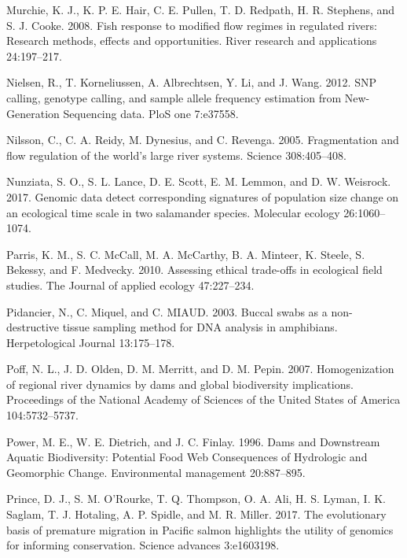 \documentclass[proquest,12pt,final]{ucthesis-CA2012} %
\begin{document}
\begin{ucmainmatter}
\leavevmode\hypertarget{ref-murchie_fish_2008}{}%
Murchie, K. J., K. P. E. Hair, C. E. Pullen, T. D. Redpath, H. R.
Stephens, and S. J. Cooke. 2008. Fish response to modified flow regimes
in regulated rivers: Research methods, effects and opportunities. River
research and applications 24:197--217.

\leavevmode\hypertarget{ref-nielsen_snp_2012}{}%
Nielsen, R., T. Korneliussen, A. Albrechtsen, Y. Li, and J. Wang. 2012.
SNP calling, genotype calling, and sample allele frequency estimation
from New-Generation Sequencing data. PloS one 7:e37558.

\leavevmode\hypertarget{ref-nilsson_fragmentation_2005}{}%
Nilsson, C., C. A. Reidy, M. Dynesius, and C. Revenga. 2005.
Fragmentation and flow regulation of the world's large river systems.
Science 308:405--408.

\leavevmode\hypertarget{ref-nunziata_genomic_2017}{}%
Nunziata, S. O., S. L. Lance, D. E. Scott, E. M. Lemmon, and D. W.
Weisrock. 2017. Genomic data detect corresponding signatures of
population size change on an ecological time scale in two salamander
species. Molecular ecology 26:1060--1074.

\leavevmode\hypertarget{ref-parris_assessing_2010}{}%
Parris, K. M., S. C. McCall, M. A. McCarthy, B. A. Minteer, K. Steele,
S. Bekessy, and F. Medvecky. 2010. Assessing ethical trade-offs in
ecological field studies. The Journal of applied ecology 47:227--234.

\leavevmode\hypertarget{ref-pidancier_buccal_2003}{}%
Pidancier, N., C. Miquel, and C. MIAUD. 2003. Buccal swabs as a
non-destructive tissue sampling method for DNA analysis in amphibians.
Herpetological Journal 13:175--178.

\leavevmode\hypertarget{ref-poff_homogenization_2007}{}%
Poff, N. L., J. D. Olden, D. M. Merritt, and D. M. Pepin. 2007.
Homogenization of regional river dynamics by dams and global
biodiversity implications. Proceedings of the National Academy of
Sciences of the United States of America 104:5732--5737.

\leavevmode\hypertarget{ref-power_dams_1996}{}%
Power, M. E., W. E. Dietrich, and J. C. Finlay. 1996. Dams and
Downstream Aquatic Biodiversity: Potential Food Web Consequences of
Hydrologic and Geomorphic Change. Environmental management 20:887--895.

\leavevmode\hypertarget{ref-prince_evolutionary_2017}{}%
Prince, D. J., S. M. O'Rourke, T. Q. Thompson, O. A. Ali, H. S. Lyman,
I. K. Saglam, T. J. Hotaling, A. P. Spidle, and M. R. Miller. 2017. The
evolutionary basis of premature migration in Pacific salmon highlights
the utility of genomics for informing conservation. Science advances
3:e1603198.


\end{ucmainmatter}
\end{document}
